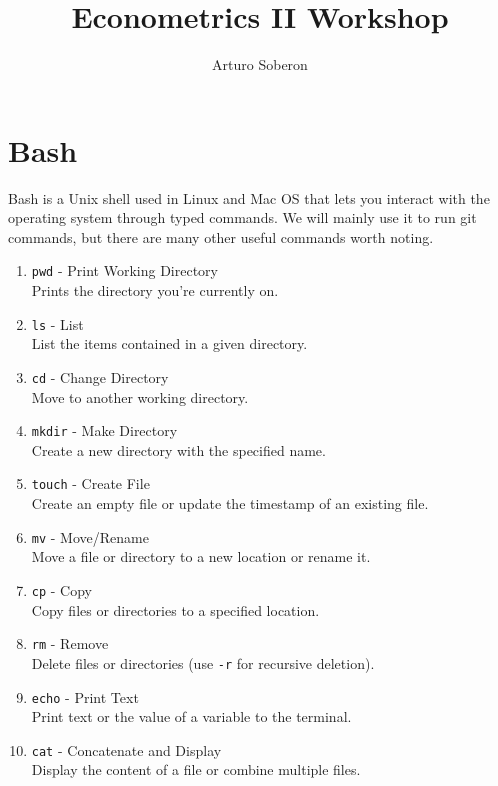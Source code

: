 \documentclass[12pt]{article}
\begin{document}
\title{Econometrics II Workshop}
\author{Arturo Soberon}
\date{}
\maketitle


\setcounter{section}{0}
\section{Bash}
Bash is a Unix shell used in Linux and Mac OS that lets you interact with
the operating system through typed commands. We will mainly use it to run
git commands, but there are many other useful commands worth noting.

\begin{enumerate}
  \item \texttt{pwd} - Print Working Directory \\
    Prints the directory you're currently on.
  \item \texttt{ls} - List \\
    List the items contained in a given directory.
  \item \texttt{cd} - Change Directory \\
    Move to another working directory.
  \item \texttt{mkdir} - Make Directory \\
    Create a new directory with the specified name.
  \item \texttt{touch} - Create File \\
    Create an empty file or update the timestamp of an existing file.
  \item \texttt{mv} - Move/Rename \\
    Move a file or directory to a new location or rename it.
  \item \texttt{cp} - Copy \\
    Copy files or directories to a specified location.
  \item \texttt{rm} - Remove \\
    Delete files or directories (use \texttt{-r} for recursive deletion).
  \item \texttt{echo} - Print Text \\
    Print text or the value of a variable to the terminal.
  \item \texttt{cat} - Concatenate and Display \\
    Display the content of a file or combine multiple files.
\end{enumerate}
\end{document}
